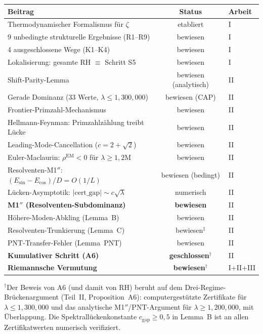 \documentclass[12pt,a4paper]{article}
\theoremstyle{definition}
\theoremstyle{remark}
\begin{document}
\begin{center}
\renewcommand{\arraystretch}{1.3}
\begin{tabular}{l|c|l}
\textbf{Beitrag} & \textbf{Status} & \textbf{Arbeit} \\\hline
Thermodynamischer Formalismus für $\zeta$ & etabliert & I \\
9 unbedingte strukturelle Ergebnisse (R1--R9) & bewiesen & I \\
4 ausgeschlossene Wege (K1--K4) & bewiesen & I \\
Lokalisierung: gesamte RH $\equiv$ Schritt S5 & bewiesen & I \\
Shift-Parity-Lemma & bewiesen (analytisch) & II \\
Gerade Dominanz ($33$ Werte, $\lambda \leq 1{,}300{,}000$) & bewiesen (CAP) & II \\
Frontier-Primzahl-Mechanismus & bewiesen & II \\
Hellmann-Feynman: Primzahlzählung treibt Lücke & bewiesen & II \\
Leading-Mode-Cancellation ($c = 2+\sqrt{2}$) & bewiesen & II \\
Euler-Maclaurin: $\rho^{\mathrm{EM}} < 0$ für $\lambda \geq 1{,}2\mathrm{M}$ & bewiesen & II \\
Resolventen-M1$''$: $(E_{\sin}-E_{\cos})/D = O(1/L)$ & bewiesen (bedingt) & II \\
Lücken-Asymptotik: $|\mathrm{cert\_gap}| \sim c\sqrt{\lambda}$ & numerisch & II \\
\textbf{M1$''$ (Resolventen-Subdominanz)} & \textbf{bewiesen} & II \\
Höhere-Moden-Abkling (Lemma~B) & bewiesen & II \\
Resolventen-Trunkierung (Lemma~C) & bewiesen${}^\ddagger$ & II \\
PNT-Transfer-Fehler (Lemma~PNT) & bewiesen & II \\
\textbf{Kumulativer Schritt (A6)} & \textbf{geschlossen${}^\dagger$} & II \\
\textbf{Riemannsche Vermutung} & \textbf{bewiesen${}^\dagger$} & I+II+III
\end{tabular}
\end{center}

\noindent${}^\dagger$Der Beweis von A6 (und damit von RH) beruht auf dem Drei-Regime-Brückenargument (Teil~II, Proposition~A6): computergestützte Zertifikate für $\lambda \leq 1{,}300{,}000$ und das analytische M1$''$/PNT-Argument für $\lambda \geq 1{,}200{,}000$, mit Überlappung. Die Spektrallückenkonstante $c_{\mathrm{gap}} \geq 0{,}5$ in Lemma~B ist an allen Zertifikatwerten numerisch verifiziert.
\end{document}
